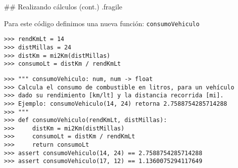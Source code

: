 ## Realizando cálculos (cont.) {.fragile}

\vspace*{-3ex}
\bgncolumns


\bgnblocknormal
Para este código definimos una nueva función: \texttt{consumoVehiculo}
\trmblocknormal


\begin{lstlisting}
>>> rendKmLt = 14
>>> distMillas = 24
>>> distKm = mi2Km(distMillas)
>>> consumoLt = distKm / rendKmLt
\end{lstlisting}

\trmcolumns

\vspace{2em}
\begin{lstlisting}[style=frame01]
>>> """ consumoVehiculo: num, num -> float
>>> Calcula el consumo de combustible en litros, para un vehículo
>>> dado su rendimiento [km/lt] y la distancia recorrida [mi].
>>> Ejemplo: consumoVehiculo(14, 24) retorna 2.7588754285714288
>>> """
>>> def consumoVehiculo(rendKmLt, distMillas):
>>>     distKm = mi2Km(distMillas)
>>>     consumoLt = distKm / rendKmLt
>>>     return consumoLt
>>> assert consumoVehiculo(14, 24) == 2.7588754285714288
>>> assert consumoVehiculo(17, 12) == 1.1360075294117649
\end{lstlisting}

